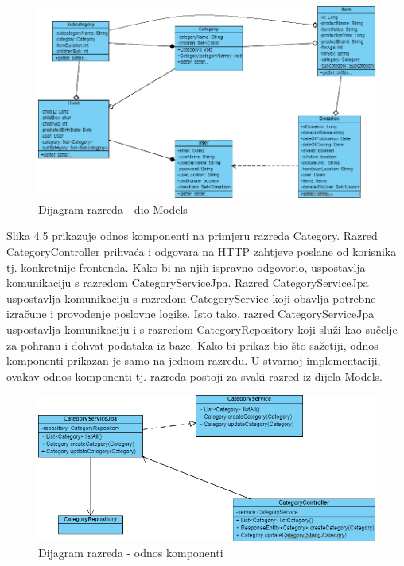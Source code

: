			\begin{figure}[H]
				\includegraphics[width=\textwidth,height=0.35\textheight]{dijagrami/Modeli.png}
				\centering
				\caption{Dijagram razreda - dio Models}
				\label{fig:Models}
			\end{figure}
			\eject
			Slika 4.5 prikazuje odnos komponenti na primjeru razreda Category. Razred CategoryController prihvaća i odgovara na HTTP zahtjeve poslane od korisnika tj. konkretnije frontenda. Kako bi na njih ispravno odgovorio, uspostavlja komunikaciju s razredom CategoryServiceJpa.
			Razred CategoryServiceJpa uspostavlja komunikaciju s razredom CategoryService koji obavlja potrebne izračune i provođenje poslovne logike. Isto tako, razred CategoryServiceJpa uspostavlja komunikaciju i s razredom CategoryRepository koji služi kao sučelje za pohranu i dohvat podataka iz baze.
			Kako bi prikaz bio što sažetiji, odnos komponenti prikazan je samo na jednom razredu. U stvarnoj implementaciji, ovakav odnos komponenti tj. razreda postoji za svaki razred iz dijela Models.\\[10pt]

			\begin{figure}[H]
				\includegraphics[width=\textwidth,height=0.35\textheight]{dijagrami/OdnosKomponenti.png}
				\centering
				\caption{Dijagram razreda - odnos komponenti}
				\label{fig:OdnosKomponenti}
			\end{figure}

